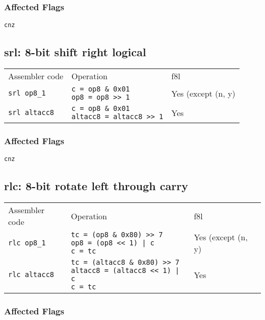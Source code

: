 \documentclass{book}
\begin{document}
\subsubsection*{Affected Flags}

\texttt{cnz}


\subsection{srl: 8-bit shift right logical}

\begin{tabular}{l l l}
Assembler code       & Operation                                                            & f8l \\
\texttt{srl op8\_1}  & \makecell{\texttt{c = op8 \& 0x01}\\\texttt{op8 = op8 >> 1}}         & Yes (except (n, y) \\
\texttt{srl altacc8} & \makecell{\texttt{c = op8 \& 0x01}\\\texttt{altacc8 = altacc8 >> 1}} & Yes
\end{tabular}

\subsubsection*{Affected Flags}

\texttt{cnz}


\subsection{rlc: 8-bit rotate left through carry}

\begin{tabular}{l l l}
Assembler code       & Operation                                                                                               & f8l \\
\texttt{rlc op8\_1}  & \makecell{\texttt{tc = (op8  \& 0x80) >> 7}\\\texttt{op8 = (op8 << 1) | c}\\\texttt{c = tc}}            & Yes (except (n, y) \\
\texttt{rlc altacc8} & \makecell{\texttt{tc = (altacc8 \& 0x80) >> 7}\\\texttt{altacc8 = (altacc8 << 1) | c}\\\texttt{c = tc}} & Yes
\end{tabular}

\subsubsection*{Affected Flags}
\end{document}
